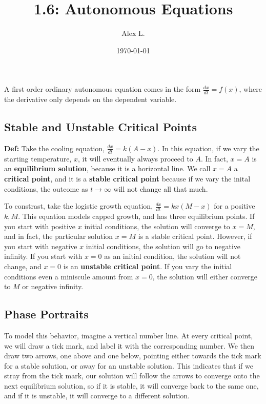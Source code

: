 \documentclass{article}
\title{1.6: Autonomous Equations}
\author{Alex L.}
\date{\today}
\begin{document}
\maketitle

A first order ordinary autonomous equation comes in the form $\frac{dx}{dt} = f(x)$, where the derivative only depends on the dependent variable. 

\subsection{Stable and Unstable Critical Points}

\textbf{Def:}  Take the cooling equation, $\frac{dx}{dt} = k(A-x)$. In this equation, if we vary the starting temperature, $x$, it will eventually always proceed to $A$. In fact, $x = A$ is an \textbf{equilibrium solution}, because it is a horizontal line. We call $x = A$ a \textbf{critical point}, and it is a \textbf{stable critical point} because if we vary the inital conditions, the outcome as $t \rightarrow \infty$ will not change all that much.  

To constrast, take the logistic growth equation, $\frac{dx}{dt} = kx(M-x)$ for a positive $k, M$. This equation models capped growth, and has three equilibrium points. If you start with positive $x$ initial conditions, the solution will converge to $x = M$, and in fact, the particular solution $x=M$ is a stable critical point. However, if you start with negative $x$ initial conditions, the solution will go to negative infinity. If you start with $x=0$ as an initial condition, the solution will not change, and $x=0$ is an \textbf{unstable critical point}. If you vary the initial conditions even a miniscule amount from $x=0$, the solution will either converge to $M$ or negative infinity. 

\subsection{Phase Portraits}

To model this behavior, imagine a vertical number line. At every critical point, we will draw a tick mark, and label it with the corresponding number. We then draw two arrows, one above and one below, pointing either towards the tick mark for a stable solution, or away for an unstable solution. This indicates that if we stray from the tick mark, our solution will follow the arrows to converge onto the next equilibrium solution, so if it is stable, it will converge back to the same one, and if it is unstable, it will converge to a different solution. 
\end{document}
